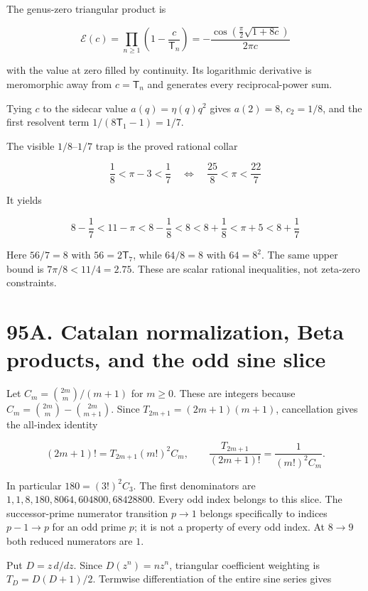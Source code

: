 \documentclass[
  11pt,
]{book}
\begin{document}
The genus-zero triangular product is

\[
\boxed{
\mathcal E(c)=\prod_{n\ge1}\left(1-\frac{c}{\mathsf T_n}\right)
=-\frac{\cos\!\left(\frac\pi2\sqrt{1+8c}\right)}{2\pi c}
}
\tag{95.4}
\]

with the value at zero filled by continuity. Its logarithmic derivative
is meromorphic away from \(c=\mathsf T_n\) and generates every
reciprocal-power sum.

Tying \(c\) to the sidecar value \(a(q)=\eta(q)q^2\) gives \(a(2)=8\),
\(c_2=1/8\), and the first resolvent term \(1/(8\mathsf T_1-1)=1/7\).

The visible \(1/8\)--\(1/7\) trap is the proved rational collar

\[
\boxed{
\frac18<\pi-3<\frac17
}
\quad\Longleftrightarrow\quad
\frac{25}{8}<\pi<\frac{22}{7}
\tag{95.5}
\]

It yields

\[
\boxed{
8-\frac17<11-\pi<8-\frac18<8
<8+\frac18<\pi+5<8+\frac17
}
\tag{95.6}
\]

Here \(56/7=8\) with \(56=2\mathsf T_7\), while \(64/8=8\) with
\(64=8^2\). The same upper bound is \(7\pi/8<11/4=2.75\). These are
scalar rational inequalities, not zeta-zero constraints.

\section{95A. Catalan normalization, Beta products, and the odd sine
slice}\label{a.-catalan-normalization-beta-products-and-the-odd-sine-slice}

Let \(C_m=\binom{2m}{m}/(m+1)\) for \(m\ge0\). These are integers
because \(C_m=\binom{2m}{m}-\binom{2m}{m+1}\). Since
\(T_{2m+1}=(2m+1)(m+1)\), cancellation gives the all-index identity

\[
\boxed{(2m+1)!=T_{2m+1}(m!)^2C_m,\qquad
\frac{T_{2m+1}}{(2m+1)!}=\frac1{(m!)^2C_m}.}
\tag{95A.1}
\]

In particular \(180=(3!)^2C_3\). The first denominators are
\(1,1,8,180,8064,604800,68428800\). Every odd index belongs to this
slice. The successor-prime numerator transition \(p\to1\) belongs
specifically to indices \(p-1\to p\) for an odd prime \(p\); it is not a
property of every odd index. At \(8\to9\) both reduced numerators are
\(1\).

Put \(D=z\,d/dz\). Since \(D(z^n)=nz^n\), triangular coefficient
weighting is \(T_D=D(D+1)/2\). Termwise differentiation of the entire
sine series gives
\end{document}
